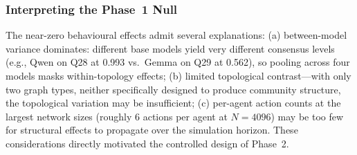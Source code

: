 \documentclass[11pt]{article}
\begin{document}
\subsubsection{Interpreting the Phase~1 Null}

The near-zero behavioural effects admit several explanations: (a) between-model variance dominates: different base models yield very different consensus levels (e.g., Qwen on Q28 at 0.993 vs.\ Gemma on Q29 at 0.562), so pooling across four models masks within-topology effects; (b) limited topological contrast---with only two graph types, neither specifically designed to produce community structure, the topological variation may be insufficient; (c) per-agent action counts at the largest network sizes (roughly 6 actions per agent at $N = 4096$) may be too few for structural effects to propagate over the simulation horizon. These considerations directly motivated the controlled design of Phase~2.
\end{document}
